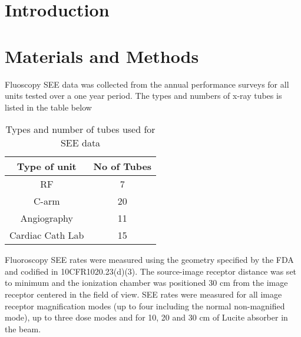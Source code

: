 \documentclass[aps,showpacs,showkeys,preprint,amsmath,amssymb]{revtex4}
\begin{document}
\keywords{}

\maketitle

\section{Introduction}
\label{sec:Introduction}


\section{Materials and Methods}
\label{sec:MatMethods}
Fluoscopy SEE data was collected from the annual performance surveys for all units tested over a one year period. The types and numbers of x-ray tubes is listed in the table below

\begin{table}[htb]
\begin{tabular}{|c|c|}
\hline
Type of unit & No of Tubes \\
\hline 
RF & 7 \\ 
\hline 
C-arm & 20 \\ 
\hline 
Angiography & 11 \\ 
\hline 
Cardiac Cath Lab & 15 \\ 
\hline 
\end{tabular} 

\caption{Types and number of tubes used for SEE data}
\end{table}

Fluoroscopy SEE rates were measured using the geometry specified by the FDA and codified in 10CFR1020.23(d)(3). The source-image receptor distance was set to minimum and the ionization chamber was positioned 30 cm from the image receptor centered in the field of view. SEE rates were measured for all image receptor magnification modes (up to four including the normal non-magnified mode), up to three dose modes and for 10, 20 and 30 cm of Lucite absorber in the beam.
\end{document}
